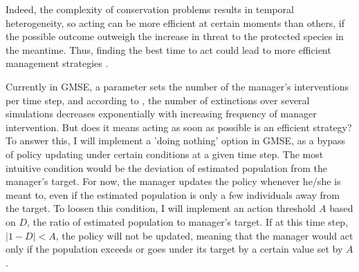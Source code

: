 \documentclass[12pt,a4paper]{article}
\begin{document}
Indeed, the complexity of conservation problems results in temporal heterogeneity, so acting can be more efficient at certain moments than others, if the possible outcome outweigh the increase in threat to the protected species in the meantime.
Thus, finding the best time to act could lead to more efficient management strategies \citep{Iacona2017waiting}.
%

Currently in GMSE, a parameter sets the number of the manager's interventions per time step, and according to \cite{duthie2018}, the number of extinctions over several simulations decreases exponentially with increasing frequency of manager intervention.
But does it means acting as soon as possible is an efficient strategy?\\

To answer this, I will implement a 'doing nothing' option in GMSE, as a bypass of policy updating under certain conditions at a given time step.
The most intuitive condition would be the deviation of estimated population from the manager's target.
For now, the manager updates the policy whenever he/she is meant to, even if the estimated population is only a few individuals away from the target.
To loosen this condition, I will implement an action threshold $A$ based on $D$, the ratio of estimated population to manager's target.
If at this time step, $|1 - D| < A$, the policy will not be updated, meaning that the manager would act only if the population exceeds or goes under its target by a certain value set by $A$.
\end{document}
